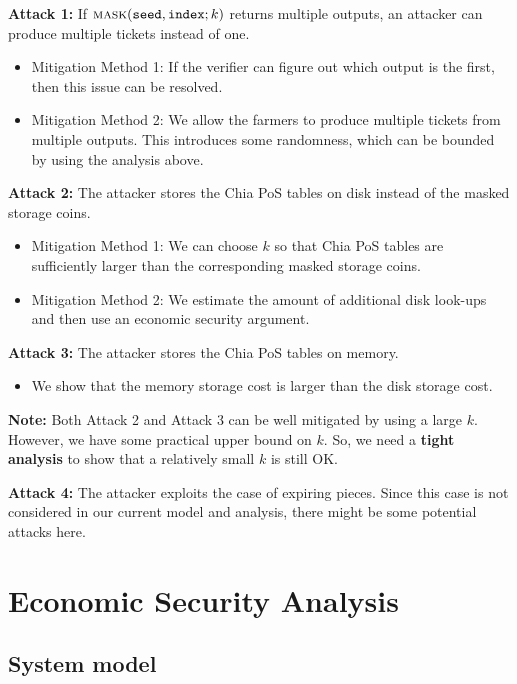 \documentclass[12pt,draftcls,onecolumn]{IEEEtran}
\newcommand{\seed}{\texttt{seed}}
\newcommand{\ind}{\texttt{index}}
\newcommand{\mask}{\textsc{mask}}
\begin{document}
{\bf Attack 1:} If $\mask(\seed, \ind; k)$ returns multiple outputs, an attacker can produce multiple tickets instead of one.

\begin{itemize}
    \item Mitigation Method 1: If the verifier can figure out which output is the first, then this issue can be resolved.
    \item Mitigation Method 2: We allow the farmers to produce multiple tickets from multiple outputs. This introduces some randomness, which can be bounded by using the analysis above.
\end{itemize}

{\bf Attack 2:} The attacker stores the Chia PoS tables on disk instead of the masked storage coins.

\begin{itemize}
    \item Mitigation Method 1: We can choose $k$ so that Chia PoS tables are sufficiently larger than the corresponding masked storage coins.
    \item Mitigation Method 2: We estimate the amount of additional disk look-ups and then use an economic security argument.
\end{itemize}

{\bf Attack 3:} The attacker stores the Chia PoS tables on memory.

\begin{itemize}
    \item We show that the memory storage cost is larger than the disk storage cost.
\end{itemize}

{\bf Note:} Both Attack 2 and Attack 3 can be well mitigated by using a large $k$. However, we have some practical upper bound on $k$. So, we need a {\bf tight analysis} to show that a relatively small $k$ is still OK.

{\bf Attack 4:} The attacker exploits the case of expiring pieces. Since this case is not considered in our current model and analysis, there might be some potential attacks here.



\section{Economic Security Analysis}

\subsection{System model}
\end{document}
